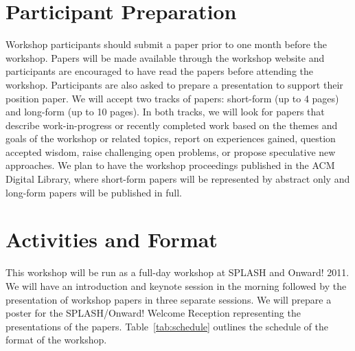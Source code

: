 \documentclass[authorpermission]{sigplanconf}
\begin{document}
\section{Participant Preparation}\label{preparation}

Workshop participants should submit a paper prior to one
month before the workshop. Papers will be made available
through the workshop website and participants are encouraged to have
read the papers before attending the workshop. Participants
are also asked to prepare a presentation to support their position
paper. We will accept two tracks of papers: short-form (up to 4 pages) and long-form (up to 10 pages). In both tracks, we will look for papers that describe work-in-progress or recently completed work based on the themes and goals of the workshop or related topics, report on experiences gained, question accepted wisdom, raise challenging open problems, or propose
speculative new approaches. We plan to have the workshop proceedings published in the ACM Digital Library, where short-form papers will be represented by abstract only and long-form papers will be published in full.

\section{Activities and Format}

This workshop will be run as a full-day workshop at SPLASH and Onward! 2011.  We
will have an introduction and keynote session in the morning followed
by the presentation of workshop papers in three separate sessions. We will prepare a poster for the SPLASH/Onward! Welcome Reception representing the presentations of the papers. Table~\ref{tab:schedule} outlines the schedule of the format of the workshop.
\end{document}
